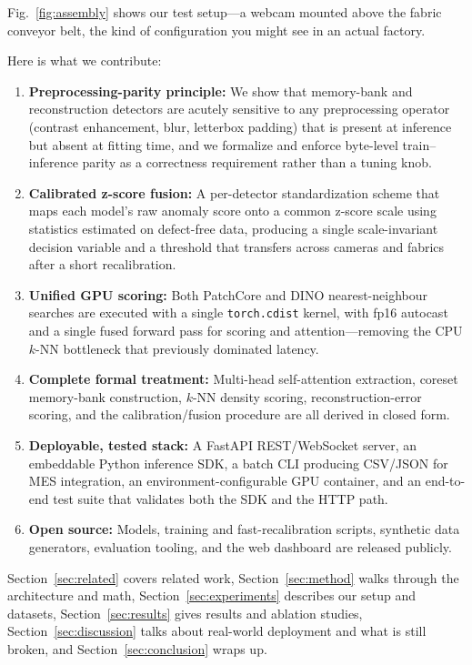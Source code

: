 \documentclass[journal]{IEEEtran}
\begin{document}
Fig.~\ref{fig:assembly} shows our test setup---a webcam mounted above the fabric conveyor belt, the kind of configuration you might see in an actual factory.

Here is what we contribute:

\begin{enumerate}[leftmargin=*,nosep]
    \item \textbf{Preprocessing-parity principle:} We show that memory-bank and reconstruction detectors are acutely sensitive to any preprocessing operator (contrast enhancement, blur, letterbox padding) that is present at inference but absent at fitting time, and we formalize and enforce byte-level train--inference parity as a correctness requirement rather than a tuning knob.
    \item \textbf{Calibrated z-score fusion:} A per-detector standardization scheme that maps each model's raw anomaly score onto a common z-score scale using statistics estimated on defect-free data, producing a single scale-invariant decision variable and a threshold that transfers across cameras and fabrics after a short recalibration.
    \item \textbf{Unified GPU scoring:} Both PatchCore and DINO nearest-neighbour searches are executed with a single \texttt{torch.cdist} kernel, with fp16 autocast and a single fused forward pass for scoring and attention---removing the CPU $k$-NN bottleneck that previously dominated latency.
    \item \textbf{Complete formal treatment:} Multi-head self-attention extraction, coreset memory-bank construction, $k$-NN density scoring, reconstruction-error scoring, and the calibration/fusion procedure are all derived in closed form.
    \item \textbf{Deployable, tested stack:} A FastAPI REST/WebSocket server, an embeddable Python inference SDK, a batch CLI producing CSV/JSON for MES integration, an environment-configurable GPU container, and an end-to-end test suite that validates both the SDK and the HTTP path.
    \item \textbf{Open source:} Models, training and fast-recalibration scripts, synthetic data generators, evaluation tooling, and the web dashboard are released publicly.
\end{enumerate}

Section~\ref{sec:related} covers related work, Section~\ref{sec:method} walks through the architecture and math, Section~\ref{sec:experiments} describes our setup and datasets, Section~\ref{sec:results} gives results and ablation studies, Section~\ref{sec:discussion} talks about real-world deployment and what is still broken, and Section~\ref{sec:conclusion} wraps up.
\end{document}
